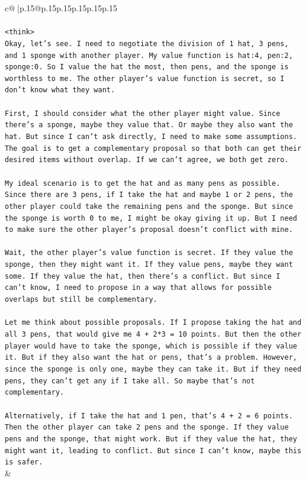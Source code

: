 \documentclass{article}
\begin{document}
{\begin{supertabular}{c@{$\;$}|p{.15\linewidth}@{}p{.15\linewidth}p{.15\linewidth}p{.15\linewidth}p{.15\linewidth}p{.15\linewidth}}
{{{\\ 
\\ 
\texttt{<think>} \\
\texttt{Okay, let's see. I need to negotiate the division of 1 hat, 3 pens, and 1 sponge with another player. My value function is hat:4, pen:2, sponge:0. So I value the hat the most, then pens, and the sponge is worthless to me. The other player's value function is secret, so I don't know what they want. } \\
\\ 
\texttt{First, I should consider what the other player might value. Since there's a sponge, maybe they value that. Or maybe they also want the hat. But since I can't ask directly, I need to make some assumptions. The goal is to get a complementary proposal so that both can get their desired items without overlap. If we can't agree, we both get zero.} \\
\\ 
\texttt{My ideal scenario is to get the hat and as many pens as possible. Since there are 3 pens, if I take the hat and maybe 1 or 2 pens, the other player could take the remaining pens and the sponge. But since the sponge is worth 0 to me, I might be okay giving it up. But I need to make sure the other player's proposal doesn't conflict with mine.} \\
\\ 
\texttt{Wait, the other player's value function is secret. If they value the sponge, then they might want it. If they value pens, maybe they want some. If they value the hat, then there's a conflict. But since I can't know, I need to propose in a way that allows for possible overlaps but still be complementary.} \\
\\ 
\texttt{Let me think about possible proposals. If I propose taking the hat and all 3 pens, that would give me 4 + 2*3 = 10 points. But then the other player would have to take the sponge, which is possible if they value it. But if they also want the hat or pens, that's a problem. However, since the sponge is only one, maybe they can take it. But if they need pens, they can't get any if I take all. So maybe that's not complementary.} \\
\\ 
\texttt{Alternatively, if I take the hat and 1 pen, that's 4 + 2 = 6 points. Then the other player can take 2 pens and the sponge. If they value pens and the sponge, that might work. But if they value the hat, they might want it, leading to conflict. But since I can't know, maybe this is safer.} \\
            }
        }
    }
    & \\ \\


\end{supertabular}}
\end{document}
